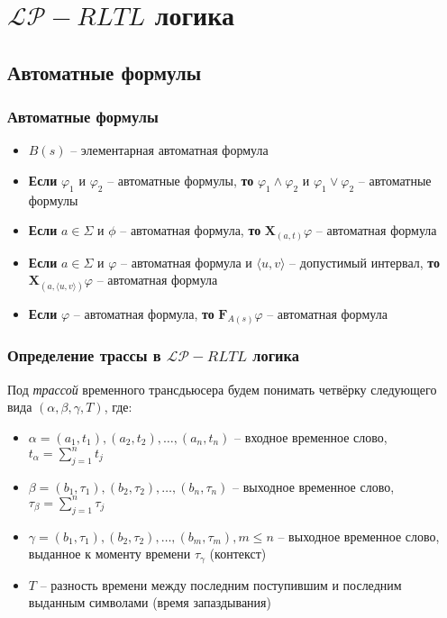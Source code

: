 \documentclass{beamer}
\begin{document}

\section{$\mathcal{LP}-RLTL$ логика}

\subsection{Автоматные формулы}

\begin{frame}
\frametitle{Автоматные формулы}

\begin{itemize}
    \item $B(s)$ -- элементарная автоматная формула
 
    \item \textbf{Если} $\varphi_1$ и $\varphi_2$ -- автоматные формулы, \textbf{то} $\varphi_1 \wedge \varphi_2$ и $\varphi_1 \vee \varphi_2$ -- автоматные формулы
 
    \item \textbf{Если} $a \in \Sigma$ и $\phi$ -- автоматная формула, \textbf{то} $\mathbf{X}_{(a, t)}\varphi$ -- автоматная формула
 
    \item \textbf{Если} $a \in \Sigma$ и $\varphi$ -- автоматная формула и $\langle u, v \rangle$ -- допустимый интервал, 
    \textbf{то} $\mathbf{X}_{(a, \langle u, v \rangle)}\varphi$ -- автоматная формула
 
    \item \textbf{Если} $\varphi$ -- автоматная формула, \textbf{то} $\mathbf{F}_{A(s)}\varphi$ -- автоматная формула
\end{itemize}

\end{frame}


\begin{frame}
\frametitle{Определение трассы в $\mathcal{LP}-RLTL$ логика}

Под \emph{трассой} временного трансдьюсера будем понимать четвёрку следующего вида $(\alpha, \beta, \gamma, T)$, где:
\begin{itemize}
	\item $\alpha = (a_1, t_1), (a_2, t_2), \dots, (a_n, t_n)$ -- входное временное слово, $t_{\alpha} = \sum\limits_{j = 1}^{n}t_j$
    \item $\beta = (b_1, \tau_1), (b_2, \tau_2), \dots, (b_n, \tau_n)$ -- выходное временное слово, $\tau_{\beta} = \sum\limits_{j = 1}^{n}\tau_j$
    \item $\gamma = (b_1, \tau_1), (b_2, \tau_2), \dots, (b_m, \tau_m), m \leq n$ -- выходное временное слово, выданное к моменту времени $\tau_{\gamma}$ (контекст)
    \item $T$ -- разность времени между последним поступившим и последним выданным символами (время запаздывания)
\end{itemize}

\end{frame}
\end{document}
